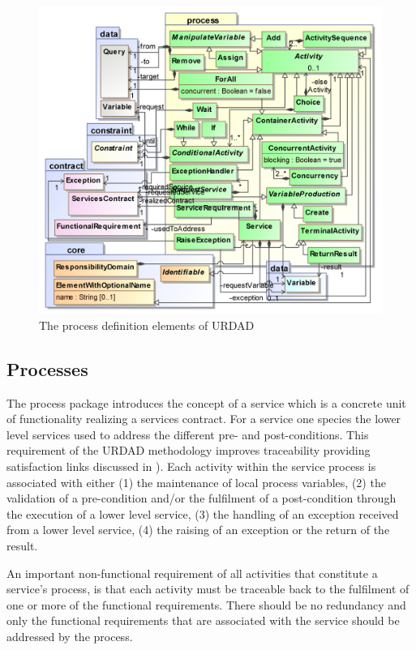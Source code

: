 \begin{figure}[Htbp]
  \centering
  \includegraphics{process}
  \caption{The process definition elements of URDAD}
  \label{fig:metamodel}
\end{figure}

\subsection{Processes}

The process package introduces the concept of a service which is a concrete unit of functionality realizing a services contract. For a service one species the lower level services used to address the different pre- and post-conditions. This requirement of the URDAD methodology improves traceability providing satisfaction links discussed in \cite{ramesh_toward_2001}). Each activity within the service process is associated with either (1) the maintenance of local process variables, (2) the validation of a pre-condition and/or the fulfilment of a post-condition through the execution of a lower level service, (3) the handling of an exception received from a lower level service, (4) the raising of an exception or the return of the result.

An important non-functional requirement of all activities that constitute a service's process, is that each activity must be traceable back to the fulfilment of one or more of the functional requirements. There should be no redundancy and only the functional requirements that are associated with the service should be addressed by the process.


